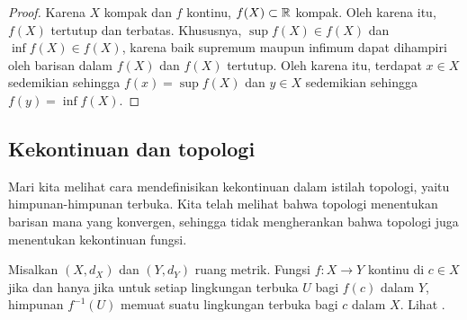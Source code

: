 \begin{proof}
Karena $X$ kompak dan $f$ kontinu,
$f(X) \subset {\mathbb{R}}$ kompak.  Oleh karena itu, $f(X)$ tertutup
dan terbatas.  Khususnya,
$\sup f(X) \in f(X)$ dan
$\inf f(X) \in f(X)$, karena baik supremum maupun infimum
dapat dihampiri oleh barisan dalam $f(X)$ dan $f(X)$ tertutup.
Oleh karena itu, terdapat $x \in X$ sedemikian sehingga $f(x) = \sup f(X)$
dan $y \in X$ sedemikian sehingga $f(y) = \inf f(X)$.
\end{proof}

\subsection{Kekontinuan dan topologi}

Mari kita melihat cara mendefinisikan kekontinuan dalam istilah topologi, yaitu
himpunan-himpunan terbuka.  Kita telah melihat bahwa topologi menentukan barisan mana yang 
konvergen, sehingga tidak mengherankan bahwa topologi juga
menentukan kekontinuan fungsi.

\begin{lemma} \label{lemma:mstopocontloc}
Misalkan $(X,d_X)$ dan $(Y,d_Y)$ ruang metrik.
Fungsi $f \colon X \to Y$ kontinu di $c \in X$
jika dan hanya jika untuk setiap lingkungan terbuka $U$ bagi $f(c)$ dalam $Y$, himpunan
$f^{-1}(U)$ memuat suatu lingkungan terbuka bagi $c$ dalam $X$.
Lihat .
\end{lemma}

\begin{myfigureht}
\caption{Untuk setiap lingkungan $U$ bagi $f(c)$, himpunan $f^{-1}(U)$ memuat suatu
lingkungan terbuka $W$ bagi $c$.\label{fig:mscontfuncpt}}
\end{myfigureht}

